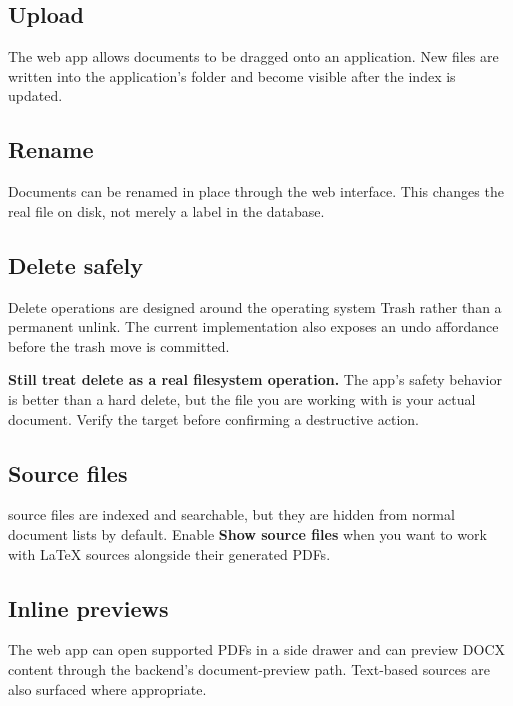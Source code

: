 \documentclass[11pt]{article}
\newcommand{\file}[1]{\texttt{\detokenize{#1}}}
\begin{document}
\subsection{Upload}

The web app allows documents to be dragged onto an application. New files are written into the application's folder and become visible after the index is updated.

\subsection{Rename}

Documents can be renamed in place through the web interface. This changes the real file on disk, not merely a label in the database.

\subsection{Delete safely}

Delete operations are designed around the operating system Trash rather than a permanent unlink. The current implementation also exposes an undo affordance before the trash move is committed.

\begin{warningbox}
\textbf{Still treat delete as a real filesystem operation.} The app's safety behavior is better than a hard delete, but the file you are working with is your actual document. Verify the target before confirming a destructive action.
\end{warningbox}

\subsection{Source files}

\file{.tex} source files are indexed and searchable, but they are hidden from normal document lists by default. Enable \textbf{Show source files} when you want to work with LaTeX sources alongside their generated PDFs.

\subsection{Inline previews}

The web app can open supported PDFs in a side drawer and can preview DOCX content through the backend's document-preview path. Text-based sources are also surfaced where appropriate.
\end{document}
